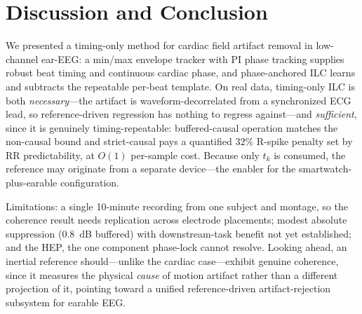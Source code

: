 \documentclass[conference]{IEEEtran}
\begin{document}
\section{Discussion and Conclusion}

We presented a timing-only method for cardiac field artifact removal in low-channel ear-EEG: a
min/max envelope tracker with PI phase tracking supplies robust beat timing and continuous cardiac
phase, and phase-anchored ILC learns and subtracts the repeatable per-beat template. On real data,
timing-only ILC is both \emph{necessary}---the artifact is waveform-decorrelated from a synchronized
ECG lead, so reference-driven regression has nothing to regress against---and \emph{sufficient},
since it is genuinely timing-repeatable: buffered-causal operation matches the non-causal bound and
strict-causal pays a quantified $32\%$ R-spike penalty set by RR predictability, at $O(1)$
per-sample cost. Because only $t_k$ is consumed, the reference may originate from a separate
device---the enabler for the smartwatch-plus-earable configuration.

Limitations: a single 10-minute recording from one subject and montage, so the coherence result
needs replication across electrode placements; modest absolute suppression ($0.8$~dB buffered) with
downstream-task benefit not yet established; and the HEP, the one component phase-lock cannot
resolve. Looking ahead, an
inertial reference should---unlike the cardiac case---exhibit genuine coherence, since it measures
the physical \emph{cause} of motion artifact rather than a different projection of it, pointing
toward a unified reference-driven artifact-rejection subsystem for earable EEG.
\end{document}

